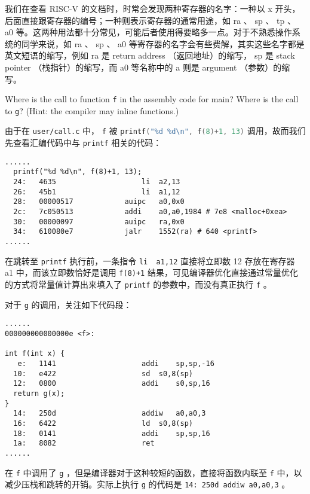 \begin{proposition}[寄存器的名字] 
我们在查看 RISC-V 的文档时，时常会发现两种寄存器的名字：一种以 x 开头，后面直接跟寄存器的编号；一种则表示寄存器的通常用途，如 ra 、 sp 、 tp 、 a0 等。这两种用法都十分常见，可能后者使用得要略多一点。对于不熟悉操作系统的同学来说，如 ra 、 sp 、 a0 等寄存器的名字会有些费解，其实这些名字都是英文短语的缩写，例如 ra 是 return address （返回地址）的缩写， sp 是 stack pointer （栈指针）的缩写，而 a0 等名称中的 a 则是 argument （参数）的缩写。
\end{proposition}

\begin{exercise}
    Where is the call to function \lstinline{f} in the assembly code for main? Where is the call to \lstinline{g}? (Hint: the compiler may inline functions.)
\end{exercise}

\begin{solution}

由于在 \lstinline{user/call.c} 中， \lstinline{f} 被 \lstinline[language=C]{printf("%d %d\n", f(8)+1, 13)} 调用，故而我们先查看汇编代码中与 \lstinline{printf} 相关的代码：
\begin{lstlisting}
......
  printf("%d %d\n", f(8)+1, 13);
  24:	4635                	li	a2,13
  26:	45b1                	li	a1,12
  28:	00000517          	auipc	a0,0x0
  2c:	7c050513          	addi	a0,a0,1984 # 7e8 <malloc+0xea>
  30:	00000097          	auipc	ra,0x0
  34:	610080e7          	jalr	1552(ra) # 640 <printf>
......
\end{lstlisting}

在跳转至 \lstinline{printf} 执行前，一条指令 \lstinline{li	a1,12} 直接将立即数 12 存放在寄存器 a1 中，而该立即数恰好是调用 \lstinline{f(8)+1} 结果，可见编译器优化直接通过常量优化的方式将常量值计算出来填入了 \lstinline{printf} 的参数中，而没有真正执行 \lstinline{f} 。

对于 \lstinline{g} 的调用，关注如下代码段：
\begin{lstlisting}
......
000000000000000e <f>:

int f(int x) {
   e:	1141                	addi	sp,sp,-16
  10:	e422                	sd	s0,8(sp)
  12:	0800                	addi	s0,sp,16
  return g(x);
}
  14:	250d                	addiw	a0,a0,3
  16:	6422                	ld	s0,8(sp)
  18:	0141                	addi	sp,sp,16
  1a:	8082                	ret
......
\end{lstlisting}

在 \lstinline{f} 中调用了 \lstinline{g} ，但是编译器对于这种较短的函数，直接将函数内联至 \lstinline{f} 中，以减少压栈和跳转的开销。实际上执行 \lstinline{g} 的代码是 \lstinline{14:	250d addiw a0,a0,3} 。
\end{solution}

